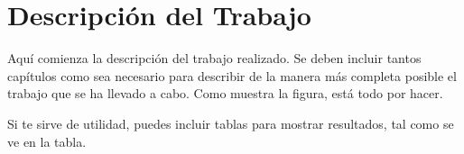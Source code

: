 \chapter{Descripción del Trabajo}
\label{cap:descripcionTrabajo}


Aquí comienza la descripción del trabajo realizado. Se deben incluir tantos capítulos como sea necesario para describir de la manera más completa posible el trabajo que se ha llevado a cabo. Como muestra la figura, está todo por hacer.

Si te sirve de utilidad,  puedes incluir tablas para mostrar resultados, tal como se ve en la tabla.



